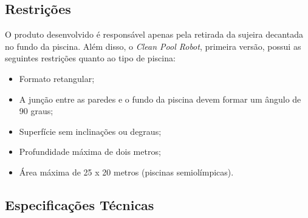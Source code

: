 \subsection{Restrições}
O produto desenvolvido é responsável apenas pela retirada da sujeira decantada
no fundo da piscina. Além disso, o \textit{Clean Pool Robot}, primeira
versão, possui as seguintes restrições quanto ao tipo de piscina:

\begin{itemize}
\item Formato retangular;
\item A junção entre as paredes e o fundo da piscina devem formar um ângulo de 90 graus;
\item Superfície sem inclinações ou degraus;
\item Profundidade máxima de dois metros;
\item Área máxima de 25 x 20 metros (piscinas semiolímpicas).
\end{itemize}

\subsection{Especificações Técnicas}

